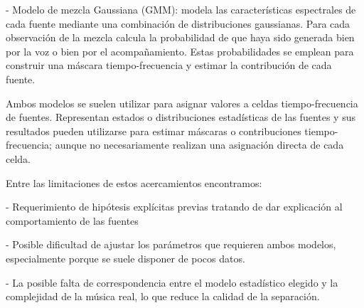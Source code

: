 - Modelo de mezcla Gaussiana \cite{gaussianMixModels} (GMM): modela las características espectrales de cada fuente mediante una combinación de distribuciones gaussianas. Para cada observación de la mezcla calcula la probabilidad de que haya sido generada bien por la voz o bien por el acompañamiento. Estas probabilidades se emplean para construir una máscara tiempo-frecuencia y estimar la contribución de cada fuente.

Ambos modelos se  suelen utilizar para asignar valores a celdas tiempo-frecuencia de fuentes. Representan estados o distribuciones estadísticas de las fuentes y sus resultados pueden utilizarse para estimar máscaras o contribuciones tiempo-frecuencia; aunque no necesariamente realizan una asignación directa de cada celda.

Entre las limitaciones de estos acercamientos encontramos:

- Requerimiento de hipótesis explícitas previas tratando de dar explicación al comportamiento de las fuentes

- Posible dificultad de ajustar los parámetros que requieren ambos modelos, especialmente porque se suele disponer de pocos datos.

- La posible falta de correspondencia entre el modelo estadístico elegido y la complejidad de la música real, lo que reduce la calidad de la separación.



